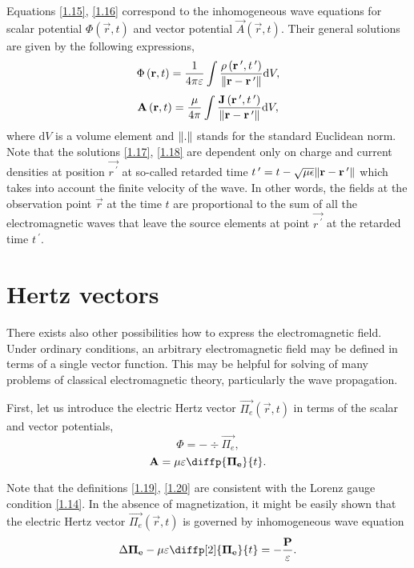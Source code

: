 Equations \ref{1.15}, \ref{1.16} correspond to the inhomogeneous wave equations for scalar potential $ \Phi\left(\vec{r}, t \right) $ and vector potential $ \vec{A}\left(\vec{r}, t \right) $. Their general solutions are given by the following expressions,
\begin{equation}
\label{1.17}
\Phi\left(\mathbf{r}, t \right) = \frac{1}{4 \pi \varepsilon} \int \frac{\rho\left(\mathbf{r^{\: \prime}}, t^{\: \prime} \right)}{\lVert\mathbf{r} - \mathbf{r^{\: \prime}}\rVert} \mathrm{d} V,
\end{equation}
\begin{equation}
\label{1.18}
\mathbf{A}\left(\mathbf{r}, t \right) = \frac{\mu}{4 \pi} \int \frac{\mathbf{J}\left(\mathbf{r^{\: \prime}}, t^{\: \prime} \right)}{\lVert\mathbf{r} - \mathbf{r^{\: \prime}}\rVert} \mathrm{d} V,
\end{equation}
where $ \mathrm{d} V $ is a volume element and $ \lVert.\rVert $ stands for the standard Euclidean norm. Note that the solutions \ref{1.17}, \ref{1.18} are dependent only on charge and current densities at position $ \vec{r^{\: \prime}} $ at so-called retarded time $ t^{\: \prime} = t - \sqrt{\mu \epsilon} \lVert\mathbf{r} - \mathbf{r^{\: \prime}}\rVert $ which takes into account the finite velocity of the wave. In other words, the fields at the observation point $ \vec{r} $ at the time $ t $ are proportional to the sum of all the electromagnetic waves that leave the source elements at point $ \vec{r^{\: \prime}} $ at the retarded time $ t^{\: \prime} $.

\section{Hertz vectors}
There exists also other possibilities how to express the electromagnetic field. Under ordinary conditions, an arbitrary electromagnetic field may be defined in terms of a single vector function. This may be helpful for solving of many problems of classical electromagnetic theory, particularly the wave propagation.

First, let us introduce the electric Hertz vector $ {\vec{\Pi_e}}\left(\vec{r}, t \right) $ in terms of the scalar and vector potentials,
\begin{equation}
\label{1.19}
\Phi = - \div{\vec{\Pi_e}},
\end{equation}
\begin{equation}
\label{1.20}
\vec{A} = \mu \varepsilon \diffp{\vec{\Pi_e}}{t}.
\end{equation}

Note that the definitions \ref{1.19}, \ref{1.20} are consistent with the Lorenz gauge condition \ref{1.14}. In the absence of magnetization, it might be easily shown that the electric Hertz vector $ {\vec{\Pi_e}}\left(\vec{r}, t \right) $ is governed by inhomogeneous wave equation
\begin{equation}
\label{1.21}
\laplace{\vec{\Pi_e}} - \mu \varepsilon \diffp[2]{\vec{\Pi_e}}{t} = -\frac{\vec{P}}{\varepsilon}.
\end{equation}

